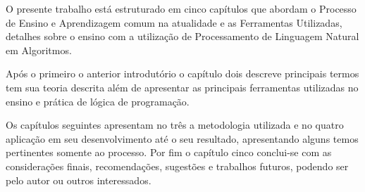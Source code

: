 \ifdraft{\color{green}}{}O presente trabalho está estruturado em cinco capítulos que abordam o Processo de Ensino e Aprendizagem comum na atualidade e as Ferramentas Utilizadas, detalhes sobre o ensino com a utilização de Processamento de Linguagem Natural em Algoritmos.

Após o primeiro o anterior introdutório o capítulo dois descreve principais termos tem sua teoria descrita além de apresentar as principais ferramentas utilizadas no ensino e prática de lógica de programação.

Os capítulos seguintes apresentam no três a metodologia utilizada e no quatro aplicação em seu desenvolvimento até o seu resultado, apresentando alguns temos pertinentes somente ao processo.
Por fim o capítulo cinco conclui-se com as considerações finais, recomendações, sugestões e trabalhos futuros, podendo ser pelo autor ou outros interessados.\color{black}
